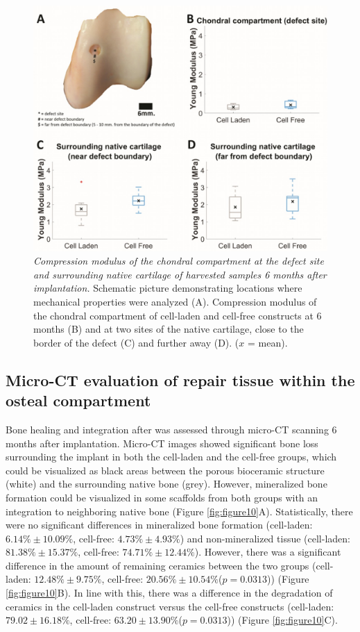 \documentclass[twocolumn, empirical, authordate, issue]{jote-new-article}
\begin{document}
\begin{figure}[h!]
\centering \includegraphics[width=\columnwidth]{media/image9.jpg}
\caption{\emph{Compression modulus of the chondral compartment at the defect site and surrounding native cartilage of harvested samples 6 months after implantation.} Schematic picture demonstrating locations where mechanical properties were analyzed (A). Compression modulus of the chondral compartment of cell-laden and cell-free constructs at 6 months (B) and at two sites of the native cartilage, close to the border of the defect (C) and further away (D). ($x$ = mean).}
\label{fig:figure9}\end{figure}

\subsection{Micro-CT evaluation of repair tissue within the osteal compartment} 

Bone healing and integration after was assessed through micro-CT scanning 6 months after implantation. Micro-CT images showed significant bone loss surrounding the implant in both the cell-laden and the cell-free groups, which could be visualized as black areas between the porous bioceramic structure (white) and the surrounding native bone (grey). However, mineralized bone formation could be visualized in some scaffolds from both groups with an integration to neighboring native bone (Figure \ref{fig:figure10}A). Statistically, there were no significant differences in mineralized bone formation (cell-laden: $6.14\% \pm 10.09\%$, cell-free: $4.73\% \pm 4.93\%$) and non-mineralized tissue (cell-laden:  $ 81.38\% \pm 15.37\% $, cell-free:  $ 74.71\% \pm 12.44\%$). However, there was a significant difference in the amount of remaining ceramics between the two groups (cell-laden:  $ 12.48\% \pm 9.75\% $, cell-free:  $ 20.56\% \pm 10.54\% $($p = 0.0313$)) (Figure \ref{fig:figure10}B). In line with this, there was a difference in the degradation of ceramics in the cell-laden construct versus the cell-free constructs (cell-laden:  $ 79.02 \pm 16.18 \% $, cell-free:  $ 63.20 \pm 13.90 \% $($p = 0.0313$)) (Figure \ref{fig:figure10}C).
\end{document}
